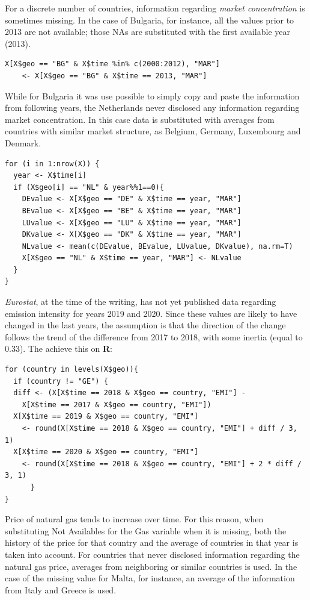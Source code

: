 \documentclass[a4paper,12pt]{book}
\begin{document}
\begin{appendices}
For a discrete number of countries, information regarding \textit{market concentration} is sometimes missing. In the case of Bulgaria, for instance, all the values prior to 2013 are not available; those NAs are substituted with the first available year (2013).

\begin{verbatim}
X[X$geo == "BG" & X$time %in% c(2000:2012), "MAR"]
	<- X[X$geo == "BG" & X$time == 2013, "MAR"]
\end{verbatim}

While for Bulgaria it was use possible to simply copy and paste the information from following years, the Netherlands never disclosed any information regarding market concentration. In this case data is substituted with averages from countries with similar market structure, as Belgium, Germany, Luxembourg and Denmark.

\begin{verbatim}
for (i in 1:nrow(X)) {
  year <- X$time[i]
  if (X$geo[i] == "NL" & year%%1==0){
    DEvalue <- X[X$geo == "DE" & X$time == year, "MAR"]
    BEvalue <- X[X$geo == "BE" & X$time == year, "MAR"]
    LUvalue <- X[X$geo == "LU" & X$time == year, "MAR"]
    DKvalue <- X[X$geo == "DK" & X$time == year, "MAR"]
    NLvalue <- mean(c(DEvalue, BEvalue, LUvalue, DKvalue), na.rm=T)
    X[X$geo == "NL" & X$time == year, "MAR"] <- NLvalue
  }
}
\end{verbatim}

\textit{Eurostat}, at the time of the writing, has not yet published data regarding emission intensity for years 2019 and 2020. Since these values are likely to have changed in the last years, the assumption is that the direction of the change follows the trend of the difference from 2017 to 2018, with some inertia (equal to 0.33). The achieve this on \textbf{R}:

\begin{verbatim}
for (country in levels(X$geo)){
  if (country != "GE") {
  diff <- (X[X$time == 2018 & X$geo == country, "EMI"] -
	X[X$time == 2017 & X$geo == country, "EMI"])
  X[X$time == 2019 & X$geo == country, "EMI"]
	<- round(X[X$time == 2018 & X$geo == country, "EMI"] + diff / 3, 1)
  X[X$time == 2020 & X$geo == country, "EMI"]
	<- round(X[X$time == 2018 & X$geo == country, "EMI"] + 2 * diff / 3, 1)
	  }
}
\end{verbatim}

Price of natural gas tends to increase over time. For this reason, when substituting Not Availables for the Gas variable when it is missing, both the history of the price for that country and the average of countries in that year is taken into account. For countries that never disclosed information regarding the natural gas price, averages from neighboring or similar countries is used. In the case of the missing value for Malta, for instance, an average of the information from Italy and Greece is used.


\end{appendices}
\end{document}
